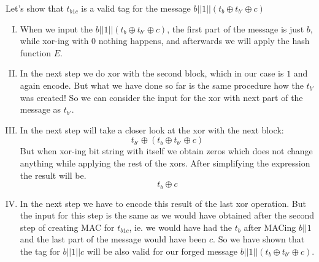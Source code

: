 \documentclass[a4paper,10pt]{article}
\begin{document}
Let's show that $t_{b1c}$ is a valid tag for the message $b||1||(t_b \oplus t_{b'} \oplus c)$
\begin{enumerate}[I.]
\item When we input the $b||1||(t_b \oplus t_{b'} \oplus c)$, the first part of the message is just $b$, while xor-ing with 0 nothing happens, and afterwards we will apply the hash function $E$.
\item In the next step we do xor with the second block, which in our case is $1$ and again encode. But what we have done so far is the same procedure how the $t_{b'}$ was created! So we can consider the input for the xor with next part of the message as $t_{b'}$.
\item In the next step will take a closer look at the xor with the next block:
$$
t_{b'} \oplus (t_b \oplus t_{b'} \oplus c)
$$
But when xor-ing bit string with itself we obtain zeros which does not change anything while applying the rest of the xors. After simplifying the expression the result will be.
$$
t_b \oplus c
$$
\item In the next step we have to encode this result of the last xor operation. But the input for this step is the same as we would have obtained after the second step of creating MAC for $t_{b1c}$, ie. we would have had the $t_b$ after MACing $b||1$ and the last part of the message would have been $c$. So we have shown that the tag for $b||1||c$ will be also valid for our forged message $b||1||(t_b \oplus t_{b'} \oplus c)$.
\end{enumerate}
\end{document}
